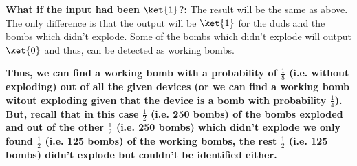 \documentclass[12pt, oneside]{book}
\theoremstyle{definition}
\theoremstyle{definition}
\theoremstyle{remark}
\begin{document}
\begin{enumerate}
    \textbf{What if the input had been $\ket{1}$?: }The result will be the same as above. The only difference is that the output will be $\ket{1}$ for the duds and the bombs which didn't explode. Some of the bombs which didn't explode will output $\ket{0}$ and thus, can be detected as working bombs.
    
    \textbf{Thus, we can find a working bomb with a probability of $\frac{1}{8}$ (i.e. without exploding) out of all the given devices (or we can find a working bomb witout exploding given that the device is a bomb with probability $\frac{1}{4}$). But, recall that in this case $\frac{1}{2}$ (i.e. 250 bombs) of the bombs exploded and out of the other $\frac{1}{2}$ (i.e. 250 bombs) which didn't explode we only found $\frac{1}{2}$ (i.e. 125 bombs) of the working bombs, the rest $\frac{1}{2}$ (i.e. 125 bombs) didn't explode but couldn't be identified either.}


\end{enumerate}
\end{document}
